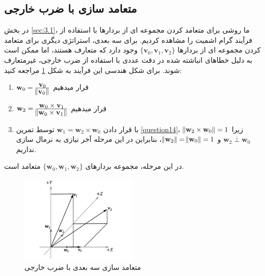 \subsection{\textbf{متعامد سازی با ضرب خارجی}}
{
    \Large
    \begin{spacing}{1.5}
        در بخش \ref{sec:3.1}، ما روشی برای متعامد کردن مجموعه ای از بردارها با استفاده از فرآیند گرام اشمیت را مشاهده کردیم.
        برای سه بعدی، استراتژی دیگری برای متعامد کردن مجموعه ای از بردارها $\{\textbf{v}_{0},\textbf{v}_{1},\textbf{v}_{2}\}$ وجود دارد که متعارف هستند،
        اما ممکن است به دلیل خطاهای انباشته شده در دقت عددی با استفاده از ضرب خارجی، غیرمتعارف شوند.
        برای شکل هندسی این فرآیند به شکل \ref{fig:4.Session.1.1.15} مراجعه کنید:

        \begin{enumerate}[label=\textbf{\arabic*}.]
            \item {$\textbf{w}_{0}=\frac{\displaystyle\textbf{v}_{0}}{\displaystyle\norm{\textbf{v}_{0}}}$ قرار میدهیم}
            \item {$\textbf{w}_{2}=\frac{\displaystyle\textbf{w}_{0}\times\textbf{v}_{1}}{\displaystyle\norm{\textbf{w}_{0}\times\textbf{v}_{1}}}$ قرار میدهیم}
            \item {با قرار دادن $\textbf{w}_{1}=\textbf{w}_{2}\times\textbf{w}_{0}$ توسط تمرین \ref{question14}، $\norm{\textbf{w}_{2}\times\textbf{w}_{0}}=1$ زیرا $\textbf{w}_{2}\perp\textbf{w}_{0}$ و $\norm{\textbf{w}_{2}}=\norm{\textbf{w}_{0}}=1$،
            بنابراین در این مرحله آخر نیازی به نرمال سازی نداریم.}
        \end{enumerate}

        در این مرحله، مجموعه بردارهای $\{\textbf{w}_{0},\textbf{w}_{1},\textbf{w}_{2}\}$ متعامد است.

        \begin{figure}[H]
            \centering
            \setlength{\belowcaptionskip}{-10pt}
            \includegraphics[width=0.5\textwidth]{Images/4/4.Session.1.1.15}
            \caption {متعامد سازی سه بعدی با ضرب خارجی}
            \label{fig:4.Session.1.1.15}
        \end{figure}


\end{spacing}}
